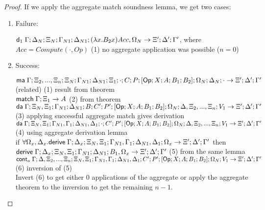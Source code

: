 \begin{proof}
   If we apply the aggregate match soundness lemma, we get two cases:
   
   \begin{enumerate}
      \item Failure:
      
      $\mathsf{d}_1 \; \Gamma; \Delta_N; \Xi_N; \Gamma_{N1}; \Delta_{N1}; (\lambda x. B_2 x)Acc, \Omega_N \rightarrow \Xi'; \Delta'; \Gamma'$, where $Acc = Compute(\cdot, Op)$ \hfill (1) no aggregate application was possible ($n = 0$)\\
      
      \item Success:
      
      $\mathsf{ma} \; \Gamma; \Xi_2, ..., \Xi_n; \Xi_N; \Gamma_{N1}; \Delta_{N1}; \Xi_1; \cdot; C; P; [\mathsf{Op} ; X ; A ; B_1; B_2]; \Omega_N; \Delta_N; \cdot \rightarrow \Xi'; \Delta'; \Gamma'$ (related) \hfill (1) result from theorem \\
      $\mathsf{match} \; \Gamma; \Xi_1 \rightarrow A$ \hfill (2) from theorem \\
      $\mathsf{da} \; \Gamma; \Xi_N, \Xi_1; \Gamma_{N1}; \Delta_{N1}; B; C'; P'; [\mathsf{Op} ; X ; A ; B_1; B_2]; \Omega_N; \Delta, \Xi_2, ..., \Xi_n; V_1 \rightarrow \Xi'; \Delta'; \Gamma'$ \hfill (3) applying successful aggregate match gives derivation \\
      $\mathsf{da} \; \Gamma; \Xi_N, \Xi_1; \Gamma_{N1}, \Gamma_1; \Delta_{N1}, \Delta_1; \cdot; C'; P'; [\mathsf{Op} ; X ; A ; B_1; B_2]; \Omega_N; \Delta, \Xi_2, ..., \Xi_n; V_1 \rightarrow \Xi'; \Delta'; \Gamma'$ \hfill (4) using aggregate derivation lemma \\
      if $\forall \Omega_x, \Delta_x. \mathsf{derive} \; \Gamma; \Delta_x; \Xi_N, \Xi_1; \Gamma_{N1}, \Gamma_1; \Delta_{N1}, \Delta_1; \Omega_x \rightarrow \Xi'; \Delta'; \Gamma'$ then $\mathsf{derive} \; \Gamma; \Delta_x; \Xi_N, \Xi_1; \Gamma_{N1}; \Delta_{N1}; B_1, \Omega_x \rightarrow \Xi'; \Delta'; \Gamma'$ \hfill (5) from the same lemma \\
      $\mathsf{cont}_a \; \Gamma; \Delta, \Xi_2, ..., \Xi_n; \Xi_N, \Xi_1; \Gamma_{N1}, \Gamma_1; \Delta_{N1}, \Delta_1; C'; P'; [\mathsf{Op} ; X ; A ; B_1; B_2]; \Omega_N; V_1 \rightarrow \Xi'; \Delta'; \Gamma'$ \hfill (6) inversion of (5) \\
      
      Invert (6) to get either $0$ applications of the aggregate or apply the aggregate theorem to the inversion to get the remaining $n-1$. 
   \end{enumerate}
\end{proof}

